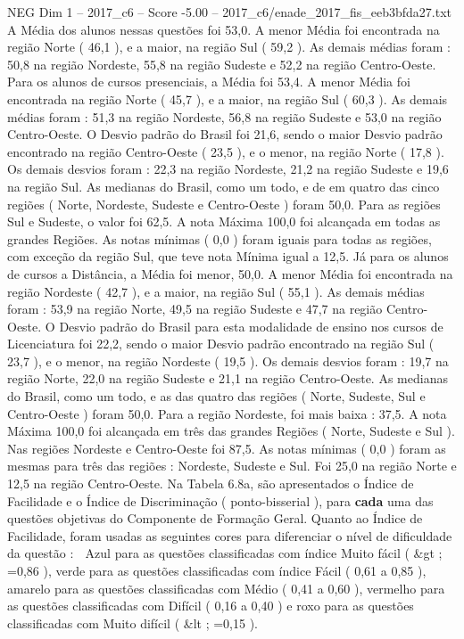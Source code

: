 \begin{textsample}{NEG Dim 1 – 2017\_c6 – Score -5.00 – 2017\_c6/enade\_2017\_fis\_eeb3bfda27.txt}
A Média dos alunos nessas questões foi 53,0.
A menor Média foi encontrada na região Norte ( 46,1 ), e a maior, na região Sul ( 59,2 ).
As demais médias foram : 50,8 na região Nordeste, 55,8 na região Sudeste e 52,2 na região Centro-Oeste.
Para os alunos de cursos presenciais, a Média foi 53,4.
A menor Média foi encontrada na região Norte ( 45,7 ), e a maior, na região Sul ( 60,3 ).
As demais médias foram : 51,3 na região Nordeste, 56,8 na região Sudeste e 53,0 na região Centro-Oeste.
O Desvio padrão do Brasil foi 21,6, sendo o maior Desvio padrão encontrado na região Centro-Oeste ( 23,5 ), e o menor, na região Norte ( 17,8 ).
Os demais desvios foram : 22,3 na região Nordeste, 21,2 na região Sudeste e 19,6 na região Sul.
As medianas do Brasil, como um todo, e de em quatro das cinco regiões ( Norte, Nordeste, Sudeste e Centro-Oeste ) foram 50,0.
Para as regiões Sul e Sudeste, o valor foi 62,5.
A nota Máxima 100,0 foi alcançada em todas as grandes Regiões.
As notas mínimas ( 0,0 ) foram iguais para todas as regiões, com exceção da região Sul, que teve nota Mínima igual a 12,5.
Já para os alunos de cursos a Distância, a Média foi menor, 50,0.
A menor Média foi encontrada na região Nordeste ( 42,7 ), e a maior, na região Sul ( 55,1 ).
As demais médias foram : 53,9 na região Norte, 49,5 na região Sudeste e 47,7 na região Centro-Oeste.
O Desvio padrão do Brasil para esta modalidade de ensino nos cursos de Licenciatura foi 22,2, sendo o maior Desvio padrão encontrado na região Sul ( 23,7 ), e o menor, na região Nordeste ( 19,5 ).
Os demais desvios foram : 19,7 na região Norte, 22,0 na região Sudeste e 21,1 na região Centro-Oeste.
As medianas do Brasil, como um todo, e as das quatro das regiões ( Norte, Sudeste, Sul e Centro-Oeste ) foram 50,0.
Para a região Nordeste, foi mais baixa : 37,5.
A nota Máxima 100,0 foi alcançada em três das grandes Regiões ( Norte, Sudeste e Sul ).
Nas regiões Nordeste e Centro-Oeste foi 87,5.
As notas mínimas ( 0,0 ) foram as mesmas para três das regiões : Nordeste, Sudeste e Sul.
Foi 25,0 na região Norte e 12,5 na região Centro-Oeste.
Na Tabela 6.8a, são apresentados o Índice de Facilidade e o Índice de Discriminação ( ponto-bisserial ), para \textbf{cada} uma das questões objetivas do Componente de Formação Geral.
Quanto ao Índice de Facilidade, foram usadas as seguintes cores para diferenciar o nível de dificuldade da questão :  Azul para as questões classificadas com índice Muito fácil ( \&gt ; =0,86 ), verde para as questões classificadas com índice Fácil ( 0,61 a 0,85 ), amarelo para as questões classificadas com Médio ( 0,41 a 0,60 ), vermelho para as questões classificadas com Difícil ( 0,16 a 0,40 ) e roxo para as questões classificadas com Muito difícil ( \&lt ; =0,15 ).

\end{textsample}
